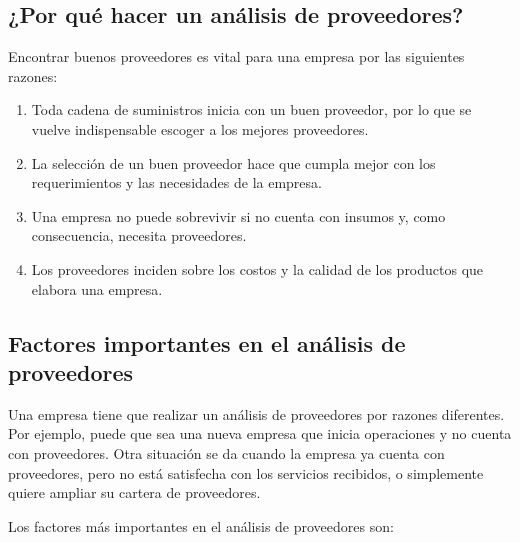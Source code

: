 \documentclass[../main]{subfiles}
\begin{document}
\subsection{¿Por qué hacer un análisis de proveedores?}
Encontrar buenos proveedores es vital para una empresa por las siguientes razones:
\begin{enumerate}
    \item Toda cadena de suministros inicia con un buen proveedor, por lo que se vuelve indispensable escoger a los mejores proveedores.
\item La selección de un buen proveedor hace que cumpla mejor con los requerimientos y las necesidades de la empresa.
\item Una empresa no puede sobrevivir si no cuenta con insumos y, como consecuencia, necesita proveedores.
\item Los proveedores inciden sobre los costos y la calidad de los productos que elabora una empresa.
\end{enumerate}

\subsection{Factores importantes en el análisis de proveedores}

Una empresa tiene que realizar un análisis de proveedores por razones diferentes. Por ejemplo, puede que sea una nueva empresa que inicia operaciones y no cuenta con proveedores. Otra situación se da cuando la empresa ya cuenta con proveedores, pero no está satisfecha con los servicios recibidos, o simplemente quiere ampliar su cartera de proveedores.

Los factores más importantes en el análisis de proveedores son:
\end{document}
